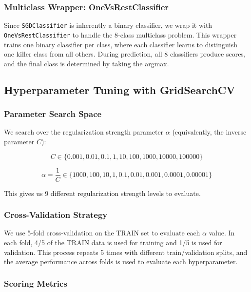 \documentclass[12pt]{article}
\begin{document}
\subsubsection{Multiclass Wrapper: OneVsRestClassifier}

Since \texttt{SGDClassifier} is inherently a binary classifier, we wrap it with \texttt{OneVsRestClassifier} to handle the 8-class multiclass problem. This wrapper trains one binary classifier per class, where each classifier learns to distinguish one killer class from all others. During prediction, all 8 classifiers produce scores, and the final class is determined by taking the argmax.

\subsection{Hyperparameter Tuning with GridSearchCV}

\subsubsection{Parameter Search Space}

We search over the regularization strength parameter $\alpha$ (equivalently, the inverse parameter $C$):

\begin{equation}
C \in \{0.001, 0.01, 0.1, 1, 10, 100, 1000, 10000, 100000\}
\end{equation}

\begin{equation}
\alpha = \frac{1}{C} \in \{1000, 100, 10, 1, 0.1, 0.01, 0.001, 0.0001, 0.00001\}
\end{equation}

This gives us 9 different regularization strength levels to evaluate.

\subsubsection{Cross-Validation Strategy}

We use 5-fold cross-validation on the TRAIN set to evaluate each $\alpha$ value. In each fold, 4/5 of the TRAIN data is used for training and 1/5 is used for validation. This process repeats 5 times with different train/validation splits, and the average performance across folds is used to evaluate each hyperparameter.

\subsubsection{Scoring Metrics}
\end{document}
